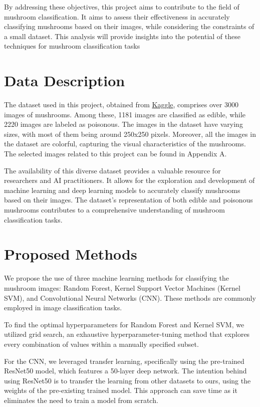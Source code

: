 \documentclass{article}
\begin{document}
By addressing these objectives, this project aims to contribute to the field of mushroom classification. It aims to assess their effectiveness in accurately classifying mushrooms based on their images, while considering the constraints of a small dataset. This analysis will provide insights into the potential of these techniques for mushroom classification tasks

\section{Data Description}
The dataset used in this project, obtained from \href{https://www.kaggle.com/datasets/marcosvolpato/edible-and-poisonous-fungi}{Kaggle}, comprises over 3000 images of mushrooms. Among these, 1181 images are classified as edible, while 2220 images are labeled as poisonous. The images in the dataset have varying sizes, with most of them being around 250x250 pixels. Moreover, all the images in the dataset are colorful, capturing the visual characteristics of the mushrooms. The selected images related to this project can be found in Appendix A.

The availability of this diverse dataset provides a valuable resource for researchers and AI practitioners. It allows for the exploration and development of machine learning and deep learning models to accurately classify mushrooms based on their images. The dataset's representation of both edible and poisonous mushrooms contributes to a comprehensive understanding of mushroom classification tasks.

\section{Proposed Methods}

We propose the use of three machine learning methods for classifying the mushroom images: Random Forest, Kernel Support Vector Machines (Kernel SVM), and Convolutional Neural Networks (CNN). These methods are commonly employed in image classification tasks. 
 
To find the optimal hyperparameters for Random Forest and Kernel SVM, we utilized grid search, an exhaustive hyperparameter-tuning method that explores every combination of values within a manually specified subset. 
 
For the CNN, we leveraged transfer learning, specifically using the pre-trained ResNet50 model, which features a 50-layer deep network. The intention behind using ResNet50 is to transfer the  learning from other datasets to ours, using the weights of the pre-existing trained model. This approach can save time as it eliminates the need to train a model from scratch.
\end{document}
